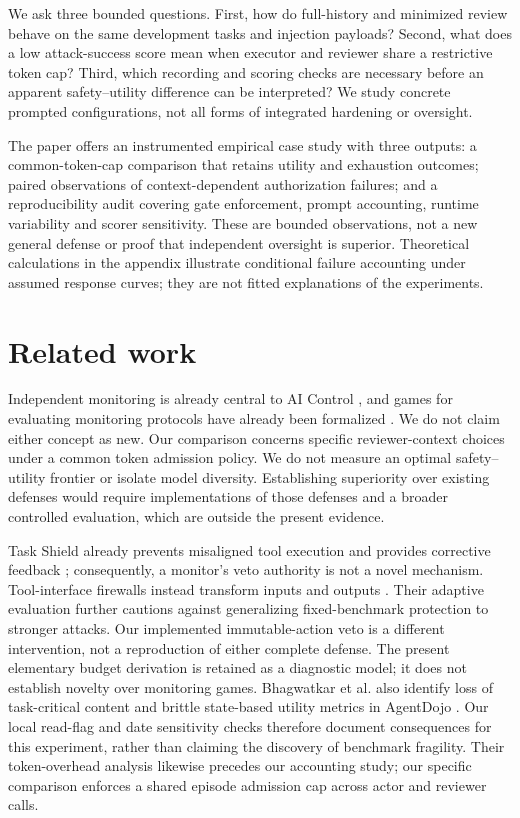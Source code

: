 \documentclass[11pt]{article}
\begin{document}
We ask three bounded questions. First, how do full-history and minimized review
behave on the same development tasks and injection payloads? Second, what does
a low attack-success score mean when executor and reviewer share a restrictive
token cap? Third, which recording and scoring checks are necessary before an
apparent safety--utility difference can be interpreted? We study concrete
prompted configurations, not all forms of integrated hardening or oversight.

The paper offers an instrumented empirical case study with three outputs:
a common-token-cap comparison that retains utility and exhaustion outcomes;
paired observations of context-dependent authorization failures; and a
reproducibility audit covering gate enforcement, prompt accounting, runtime
variability and scorer sensitivity. These are bounded observations, not a new
general defense or proof that independent oversight is superior. Theoretical
calculations in the appendix illustrate conditional failure accounting under
assumed response curves; they are not fitted explanations of the experiments.

\section{Related work}
Independent monitoring is already central to AI Control
\cite{greenblatt2024}, and games for evaluating monitoring protocols have already
been formalized \cite{griffin2024}. We do not claim either concept as new.
Our comparison concerns specific reviewer-context choices under a common
token admission policy. We do not measure an optimal safety--utility frontier
or isolate model diversity. Establishing superiority over existing defenses
would require implementations of those defenses and a broader controlled
evaluation, which are outside the present evidence.

Task Shield already prevents misaligned tool execution and provides corrective
feedback \cite{jia2024}; consequently, a monitor's veto authority is not a
novel mechanism. Tool-interface firewalls instead transform inputs and outputs
\cite{bhagwatkar2025}. Their adaptive evaluation further cautions against
generalizing fixed-benchmark protection to stronger attacks. Our implemented
immutable-action veto is a different intervention, not a reproduction of
either complete defense. The present elementary budget derivation is retained
as a diagnostic model; it does not establish novelty over monitoring games.
Bhagwatkar et al. also identify loss of task-critical content and brittle
state-based utility metrics in AgentDojo \cite{bhagwatkar2025}. Our local
read-flag and date sensitivity checks therefore document consequences for
this experiment, rather than claiming the discovery of benchmark fragility.
Their token-overhead analysis likewise precedes our accounting study; our
specific comparison enforces a shared episode admission cap across actor
and reviewer calls.
\end{document}
